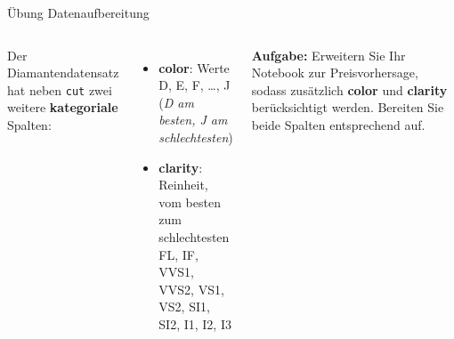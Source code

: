 \begin{frame}{Übung Datenaufbereitung}
\begin{columns}
Der Diamantendatensatz hat neben \texttt{cut} zwei weitere
\textbf{kategoriale} Spalten:

\begin{itemize}
  \item \textbf{color}: Werte D, E, F, \dots, J\\
        ({\itshape D am besten, J am schlechtesten})
  \item \textbf{clarity}: Reinheit, vom besten zum schlechtesten\\
        FL, IF, VVS1, VVS2, VS1, VS2, SI1, SI2, I1, I2, I3
\end{itemize}

\vspace{0.4em}
\textbf{Aufgabe:} Erweitern Sie Ihr Notebook zur Preisvorhersage, sodass
zusätzlich \textbf{color} und \textbf{clarity} berücksichtigt werden.
Bereiten Sie beide Spalten entsprechend auf.

\centering
{}
\end{columns}
\end{frame}

\makequizpage{\QUIZURL}{\QUIZQRCODE}{\QUIZIMAGE}
\makequestionspage{\FRAGENIMAGE}